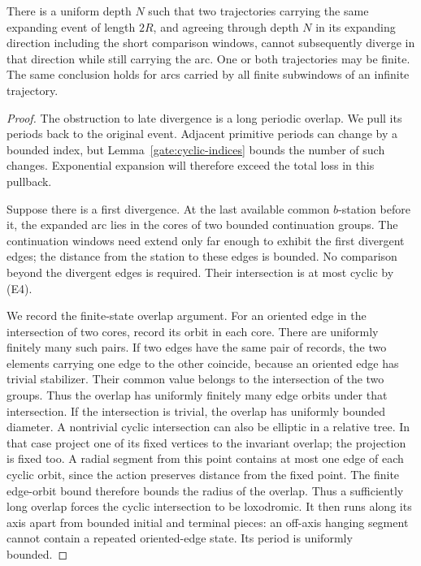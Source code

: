 \begin{lemma}\label{gate:phase-uniqueness}
There is a uniform depth $N$ such that two trajectories carrying the same
expanding event of length $2R$, and agreeing through depth $N$ in its expanding direction
including the short comparison windows, cannot subsequently diverge in
that direction while still carrying the arc.  One or both trajectories
may be finite.  The same conclusion holds for arcs carried by all finite
subwindows of an infinite trajectory.
\end{lemma}
\begin{proof}
The obstruction to late divergence is a long periodic overlap. We
pull its periods back to the original event. Adjacent primitive
periods can change by a bounded index, but
Lemma~\ref{gate:cyclic-indices} bounds the number of such changes.
Exponential expansion will therefore exceed the total loss in this
pullback.

Suppose there is a first divergence.  At the last available common
$b$-station before it, the expanded arc lies in the cores of two bounded
continuation groups.  The continuation windows need extend only far
enough to exhibit the first divergent edges; the distance from the station
to these edges is bounded.  No comparison beyond the divergent edges is
required.  Their intersection is at most cyclic by (E4).

We record the finite-state overlap argument.  For an oriented edge in the
intersection of two cores, record its orbit in each core.  There are
uniformly finitely many such pairs.  If two edges have the same pair of
records, the two elements carrying one edge to the other coincide, because
an oriented edge has trivial stabilizer.  Their common value belongs to
the intersection of the two groups.  Thus the overlap has uniformly
finitely many edge orbits under that intersection. If the intersection
is trivial, the overlap has uniformly bounded diameter. A nontrivial
cyclic intersection can also be elliptic in a relative tree. In that
case project one of its fixed vertices to the invariant overlap; the
projection is fixed too. A radial segment from this point contains at
most one edge of each cyclic orbit, since the action preserves distance
from the fixed point. The finite edge-orbit bound therefore bounds the
radius of the overlap. Thus a sufficiently long overlap forces the
cyclic intersection to be loxodromic. It then runs along its axis apart
from bounded initial and terminal pieces: an off-axis hanging segment
cannot contain a repeated oriented-edge state. Its period is uniformly
bounded.


\end{proof}

